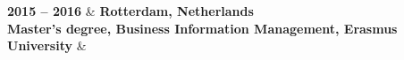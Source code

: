 \textbf{2015 – 2016} & \textbf{Rotterdam, Netherlands} \\
\textbf{Master's degree, Business Information Management, Erasmus University} & \\ 